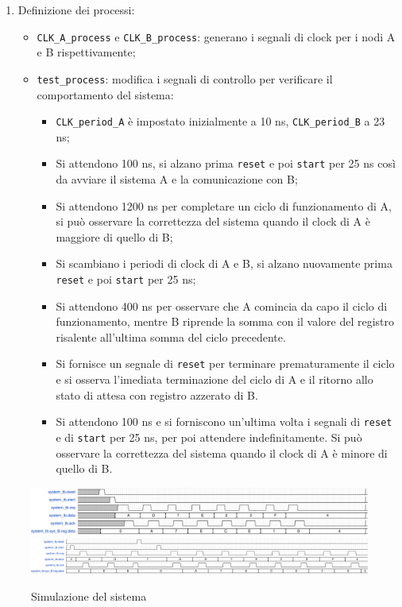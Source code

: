 \begin{enumerate}
\begin{itemize}
    \end{itemize}
    \item Definizione dei processi:
    \begin{itemize}
        \item \texttt{CLK\_A\_process} e \texttt{CLK\_B\_process}: generano i segnali di clock per i nodi A e B rispettivamente;
        \item \texttt{test\_process}: modifica i segnali di controllo per verificare il comportamento del sistema:
        \begin{itemize}
            \item \texttt{CLK\_period\_A} è impostato inizialmente a 10 ns, \texttt{CLK\_period\_B} a 23 ns;
            \item Si attendono 100 ns, si alzano prima \texttt{reset} e poi \texttt{start} per 25 ns così da avviare il sistema A e la comunicazione con B;
            \item Si attendono 1200 ns per completare un ciclo di funzionamento di A, si può osservare la correttezza del sistema quando il clock di A è maggiore di quello di B;
            \item Si scambiano i periodi di clock di A e B, si alzano nuovamente prima \texttt{reset} e poi \texttt{start} per 25 ns;
            \item Si attendono 400 ns per osservare che A comincia da capo il ciclo di funzionamento, mentre B riprende la somma con il valore del registro risalente all'ultima somma del ciclo precedente.
            \item Si fornisce un segnale di \texttt{reset} per terminare prematuramente il ciclo e si osserva l'imediata terminazione del ciclo di A e il ritorno allo stato di attesa con registro azzerato di B.
            \item Si attendono 100 ns e si forniscono un'ultima volta i segnali di \texttt{reset} e di \texttt{start} per 25 ns, per poi attendere indefinitamente. Si può osservare la correttezza del sistema quando il clock di A è minore di quello di B.
        \end{itemize}
    \end{itemize}
\end{enumerate}


\begin{figure}[h]
    \centering
    \includegraphics[width=0.75\linewidth]{img/december_exam_tb_1.pdf}
    \includegraphics[width=\linewidth]{img/december_exam_tb_2.pdf}
    \caption{Simulazione del sistema}
    \label{fig:december_exam_tb}
\end{figure}
